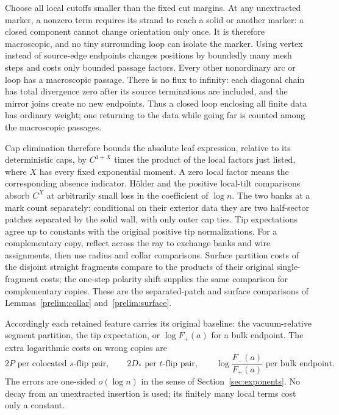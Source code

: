 Choose all local cutoffs smaller than the fixed cut margins.  At any
unextracted marker, a nonzero term requires its strand to reach a
solid or another marker: a closed component cannot change orientation
only once.  It is therefore macroscopic, and no tiny surrounding loop
can isolate the marker.  Using vertex instead of source-edge endpoints
changes positions by boundedly many mesh steps and costs only bounded
passage factors.  Every other nonordinary arc or loop has a macroscopic
passage.  There is no flux to infinity: each diagonal chain has total
divergence zero after its source terminations are included, and the
mirror joins create no new endpoints.  Thus a closed loop enclosing
all finite data has ordinary weight; one returning to the data while
going far is counted among the macroscopic passages.

Cap elimination therefore bounds the absolute leaf expression,
relative to its deterministic caps, by $C^{1+X}$ times the product
of the local factors just listed, where $X$ has every fixed
exponential moment.  A zero local factor means the corresponding
absence indicator.  H\"older and the positive local-tilt comparisons
absorb $C^X$ at arbitrarily small loss in the coefficient of $\log n$.
The two banks at a mark count separately: conditional on their exterior
data they are two half-sector patches separated by the solid wall,
with only outer cap ties.  Tip expectations agree up to constants with
the original positive tip normalizations.  For a complementary copy,
reflect across the ray to exchange banks and wire assignments, then
use radius and collar comparisons.  Surface partition costs of the
disjoint straight fragments compare to the products of their original
single-fragment costs; the one-step polarity shift supplies the same
comparison for complementary copies.  These are the separated-patch
and surface comparisons of Lemmas~\ref{prelim:collar} and~\ref{prelim:surface}.

Accordingly each retained feature carries its original baseline:
the vacuum-relative segment partition, the tip expectation, or
$\log F_+(a)$ for a bulk endpoint.  The extra logarithmic costs on
wrong copies are
\begin{equation}
 2P\text{ per colocated }s\text{-flip pair},\qquad
 2D_*\text{ per }t\text{-flip pair},\qquad
 \log\frac{F_-(a)}{F_+(a)}\text{ per bulk endpoint}.
 \label{hol:wrong-costs}
\end{equation}
The errors are one-sided $o(\log n)$ in the sense of
Section~\ref{sec:exponents}.  No decay from an unextracted insertion
is used; its finitely many local terms cost only a constant.


